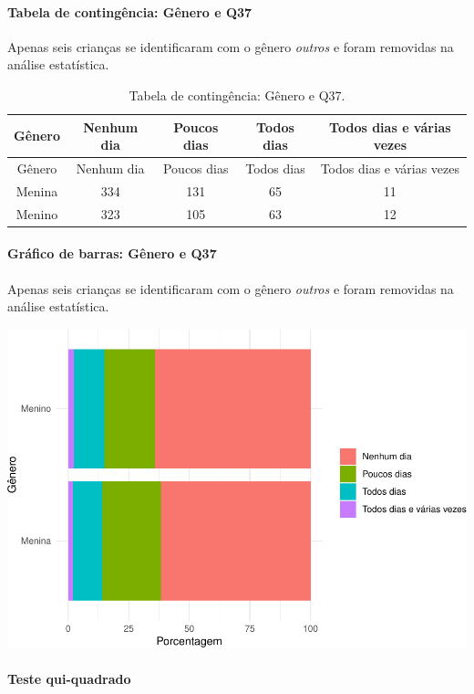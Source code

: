 \documentclass[]{article}
\let\oldparagraph\paragraph
\renewcommand{\paragraph}[1]{\oldparagraph{#1}\mbox{}}
\begin{document}
\cleardoublepage

\hypertarget{tabela-de-continguxeancia-guxeanero-e-q37}{%
\paragraph{Tabela de contingência: Gênero e Q37}\label{tabela-de-continguxeancia-guxeanero-e-q37}}

Apenas seis crianças se identificaram com o gênero \emph{outros} e foram removidas na análise estatística.

\begin{longtable}[]{@{}ccccc@{}}
\caption{\label{tab:unnamed-chunk-1380}Tabela de contingência: Gênero e Q37.}\tabularnewline
\toprule
Gênero & Nenhum dia & Poucos dias & Todos dias & Todos dias e várias vezes\tabularnewline
\midrule
\endfirsthead
\toprule
Gênero & Nenhum dia & Poucos dias & Todos dias & Todos dias e várias vezes\tabularnewline
\midrule
\endhead
Menina & 334 & 131 & 65 & 11\tabularnewline
Menino & 323 & 105 & 63 & 12\tabularnewline
\bottomrule
\end{longtable}

\hypertarget{gruxe1fico-de-barras-guxeanero-e-q37}{%
\paragraph{Gráfico de barras: Gênero e Q37}\label{gruxe1fico-de-barras-guxeanero-e-q37}}

Apenas seis crianças se identificaram com o gênero \emph{outros} e foram removidas na análise estatística.

\begin{center}\includegraphics[width=0.75\linewidth]{relatorio_covid19_files/figure-latex/unnamed-chunk-1381-1} \end{center}

\hypertarget{teste-qui-quadrado-118}{%
\paragraph{Teste qui-quadrado}\label{teste-qui-quadrado-118}}
\end{document}

